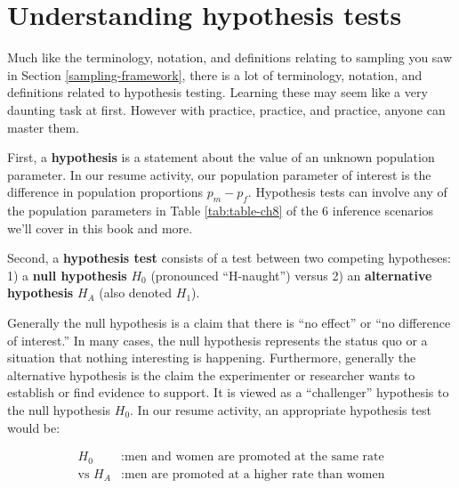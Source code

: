 \documentclass[
]{book}
\begin{document}
\hypertarget{understanding-ht}{%
\section{Understanding hypothesis tests}\label{understanding-ht}}

Much like the terminology, notation, and definitions relating to sampling you saw in Section \ref{sampling-framework}, there is a lot of terminology, notation, and definitions related to hypothesis testing. Learning these may seem like a very daunting task at first. However with practice, practice, and practice, anyone can master them.

First, a \textbf{hypothesis}  is a statement about the value of an unknown population parameter. In our resume activity, our population parameter of interest is the difference in population proportions \(p_{m} - p_{f}\). Hypothesis tests can involve any of the population parameters in Table \ref{tab:table-ch8} of the 6 inference scenarios we'll cover in this book and more.

Second, a \textbf{hypothesis test}  consists of a test between two competing hypotheses: 1) a \textbf{null hypothesis} \(H_0\) (pronounced ``H-naught'') versus 2) an \textbf{alternative hypothesis} \(H_A\) (also denoted \(H_1\)).

Generally the null hypothesis  is a claim that there is ``no effect'' or ``no difference of interest.'' In many cases, the null hypothesis represents the status quo or a situation that nothing interesting is happening. Furthermore, generally the alternative hypothesis  is the claim the experimenter or researcher wants to establish or find evidence to support. It is viewed as a ``challenger'' hypothesis to the null hypothesis \(H_0\). In our resume activity, an appropriate hypothesis test would be:

\[
\begin{aligned}
H_0 &: \text{men and women are promoted at the same rate}\\
\text{vs } H_A &: \text{men are promoted at a higher rate than women}
\end{aligned}
\]
\end{document}
